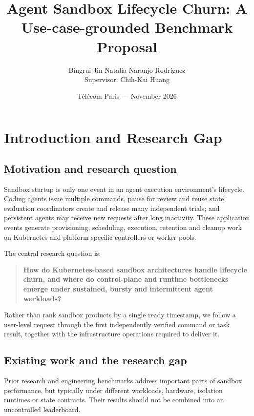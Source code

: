\documentclass[
  a4paper,
]{article}
\title{Agent Sandbox Lifecycle Churn: A Use-case-grounded Benchmark Proposal}
\author{Bingrui Jin \qquad Natalia Naranjo Rodríguez\\[0.5em]\small Supervisor: Chih-Kai Huang}
\date{Télécom Paris --- November 2026}
\begin{document}
\maketitle
\setcounter{tocdepth}{2}
\tableofcontents

\section{Introduction and Research Gap}
\label{sec:introduction}
\subsection{Motivation and research question}
Sandbox startup is only one event in an agent execution
environment's lifecycle. Coding agents issue multiple
commands, pause for review and reuse state; evaluation
coordinators create and release many independent trials;
and persistent agents may receive new requests after
long inactivity. These application events generate
provisioning, scheduling, execution, retention and
cleanup work on Kubernetes and platform-specific
controllers or worker pools.

The central research question is:
\begin{quote}
\textbf{How do Kubernetes-based sandbox architectures
handle lifecycle churn, and where do control-plane
and runtime bottlenecks emerge under sustained,
bursty and intermittent agent workloads?}
\end{quote}

Rather than rank sandbox products by a single
ready timestamp, we follow a user-level request
through the first independently verified command
or task result, together with the infrastructure
operations required to deliver it.

\subsection{Existing work and the research gap}
Prior research and engineering benchmarks address
important parts of sandbox performance, but typically
under different workloads, hardware, isolation runtimes
or state contracts. Their results should not be
combined into an uncontrolled leaderboard.
\end{document}
